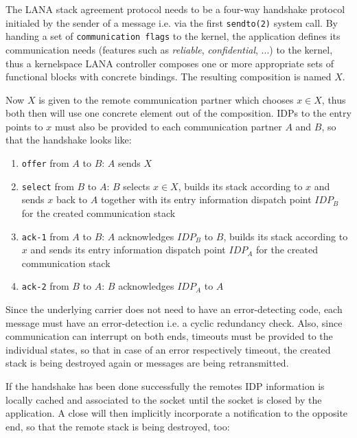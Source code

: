 \documentclass[times,10pt,twocolumn]{article}
\begin{document}
The LANA stack agreement protocol needs to be a four-way handshake protocol
initialed by the sender of a message i.e. via the first \texttt{sendto(2)}
system call. By handing a set of \texttt{communication flags} to the kernel, the
application defines its communication needs (features such as \textit{reliable},
\textit{confidential}, ...) to the kernel, thus a kernelspace LANA controller
composes one or more appropriate sets of functional blocks with concrete 
bindings. The resulting composition is named $X$.\newline

Now $X$ is given to the remote communication partner which chooses $x\in{}X$,
thus both then will use one concrete element out of the composition. IDPs to
the entry points to $x$ must also be provided to each communication partner 
$A$ and $B$, so that the handshake looks like:

\begin{enumerate}
        \setlength{\itemsep}{-1mm}
	\item \texttt{offer} from $A$ to $B$: $A$ sends $X$
	\item \texttt{select} from $B$ to $A$: $B$ selects $x\in{}X$, builds
              its stack according to $x$ and sends $x$ back to $A$ together 
              with its entry information dispatch point $IDP_B$ for the created
              communication stack
        \item \texttt{ack-1} from $A$ to $B$: $A$ acknowledges $IDP_B$
              to $B$, builds its stack according to $x$ and sends its entry
              information dispatch point $IDP_A$ for the created 
              communication stack
	\item \texttt{ack-2} from $B$ to $A$: $B$ acknowledges $IDP_A$
              to $A$
\end{enumerate}

Since the underlying carrier does not need to have an error-detecting code, each
message must have an error-detection i.e. a cyclic redundancy check. Also, since
communication can interrupt on both ends, timeouts must be provided to the
individual states, so that in case of an error respectively timeout, the 
created stack is being destroyed again or messages are being retransmitted.\newline

If the handshake has been done successfully the remotes IDP information is 
locally cached and associated to the socket until the socket is closed by the
application. A close will then implicitly incorporate a notification to the
opposite end, so that the remote stack is being destroyed, too:
\end{document}

